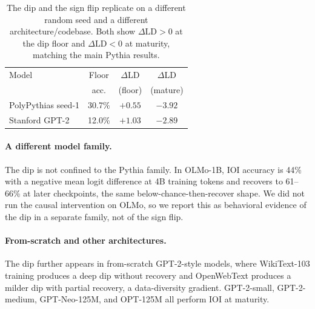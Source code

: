 \documentclass[11pt]{article}
\begin{document}
\begin{table}[h]
  \centering\small
  \setlength{\tabcolsep}{4pt}
  \begin{tabular}{lccc}
    \toprule
    Model & Floor & $\Delta$LD & $\Delta$LD \\
          & acc. & (floor) & (mature) \\
    \midrule
    PolyPythias seed-1 & 30.7\% & $+0.55$ & $-3.92$ \\
    Stanford GPT-2     & 12.0\% & $+1.03$ & $-2.89$ \\
    \bottomrule
  \end{tabular}
  \caption{The dip and the sign flip replicate on a different random seed and a
  different architecture/codebase. Both show $\Delta\mathrm{LD}>0$ at the dip
  floor and $\Delta\mathrm{LD}<0$ at maturity, matching the main Pythia results.}
  \label{tab:crossmodel}
\end{table}

\paragraph{A different model family.}
The dip is not confined to the Pythia family. In OLMo-1B, IOI accuracy is 44\%
with a negative mean logit difference at 4B training tokens and recovers to
61--66\% at later checkpoints, the same below-chance-then-recover shape. We did
not run the causal intervention on OLMo, so we report this as behavioral evidence
of the dip in a separate family, not of the sign flip.

\paragraph{From-scratch and other architectures.}
The dip further appears in from-scratch GPT-2-style models, where WikiText-103
training produces a deep dip without recovery and OpenWebText produces a milder
dip with partial recovery, a data-diversity gradient. GPT-2-small, GPT-2-medium,
GPT-Neo-125M, and OPT-125M all perform IOI at maturity.
\end{document}
